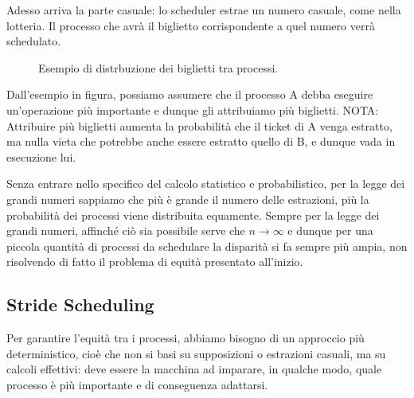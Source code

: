 \documentclass[12pt]{report}
\begin{document}
	Adesso arriva la parte casuale: lo scheduler estrae un numero casuale, come nella lotteria. Il processo che avrà il biglietto corrispondente a quel numero verrà schedulato.
	\begin{figure}[H]
		\centering
		\caption{Esempio di distrbuzione dei biglietti tra processi.}
	\end{figure}
	
	Dall'esempio in figura, possiamo assumere che il processo A debba eseguire un'operazione più importante e dunque gli attribuiamo più biglietti. NOTA: Attribuire più biglietti aumenta la probabilità che il ticket di A venga estratto, ma nulla vieta che potrebbe anche essere estratto quello di B, e dunque vada in esecuzione lui.
	\smallbreak
	
	Senza entrare nello specifico del calcolo statistico e probabilistico, per la legge dei grandi numeri sappiamo che più è grande il numero delle estrazioni, più la probabilità dei processi viene distribuita equamente. Sempre per la legge dei grandi numeri, affinché ciò sia possibile serve che $n \longrightarrow \infty$ e dunque per una piccola quantità di processi da schedulare la disparità si fa sempre più ampia, non risolvendo di fatto il problema di equità presentato all'inizio.
	
	\subsection{Stride Scheduling}
	Per garantire l'equità tra i processi, abbiamo bisogno di un approccio più deterministico, cioè che non si basi su supposizioni o estrazioni casuali, ma su calcoli effettivi: deve essere la macchina ad imparare, in qualche modo, quale processo è più importante e di conseguenza adattarsi.
	\smallbreak
	
\end{document}
